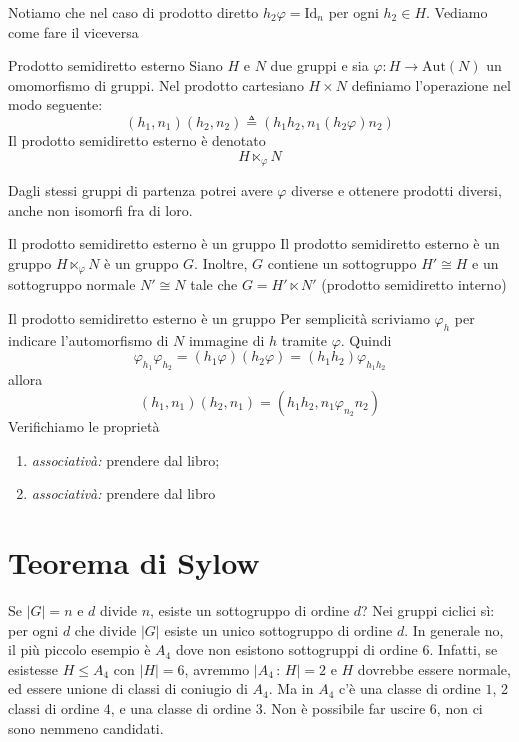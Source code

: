 \documentclass[a4paper]{article}
\begin{document}
Notiamo che nel caso di prodotto diretto
\(h_2 \varphi = \text{Id}_n\) per ogni \(h_2 \in H\).
Vediamo come fare il viceversa

\begin{snippetdefinition}{Prodotto semidiretto esterno}
    Siano \(H\) e \(N\) due gruppi e sia \(\varphi\colon H \to \text{Aut}(N)\)
    un omomorfismo di gruppi. Nel prodotto cartesiano
    \(H \times N\) definiamo l'operazione nel modo seguente:
    \[
        (h_1, n_1)(h_2, n_2) \triangleq (h_1h_2, n_1(h_2 \varphi) n_2)
    \]
    Il prodotto semidiretto esterno è denotato
    \[
        H \ltimes_\varphi N
    \]
\end{snippetdefinition}

Dagli stessi gruppi di partenza potrei avere \(\varphi\) diverse e ottenere
prodotti diversi, anche non isomorfi fra di loro.

\begin{snippettheorem}{Il prodotto semidiretto esterno è un gruppo}
    Il prodotto semidiretto esterno è un gruppo
    \(H \ltimes_\varphi N\) è un gruppo \(G\). Inoltre,
    \(G\) contiene un sottogruppo \(H' \cong H\) e
    un sottogruppo normale \(N' \cong N\)
    tale che \(G = H'\ltimes N'\) (prodotto semidiretto interno)
\end{snippettheorem}

\begin{snippetproof}{Il prodotto semidiretto esterno è un gruppo}
    Per semplicità scriviamo \(\varphi_h\) per indicare l'automorfismo
    di \(N\) immagine di \(h\) tramite \(\varphi\).
    Quindi \[
        \varphi_{h_1}\varphi_{h_2} =
        (h_1 \varphi)(h_2 \varphi) = (h_1h_2)\varphi_{h_1h_2}
    \]
    allora
    \[
        (h_1, n_1)(h_2, n_1) = (h_1h_2, n_1\varphi_{n_2} n_2)
    \]
    Verifichiamo le proprietà
    \begin{enumerate}
        \item \emph{associativà:} prendere dal libro;
        \item \emph{associativà:} prendere dal libro
    \end{enumerate}
\end{snippetproof}

\pagebreak

\section{Teorema di Sylow}

Se \(|G| = n\) e \(d\) divide \(n\), esiste un sottogruppo di ordine \(d\)?
Nei gruppi ciclici sì: per ogni \(d\) che divide \(|G|\) esiste un unico sottogruppo di ordine \(d\).
In generale no, il più piccolo esempio è \(A_4\)
dove non esistono sottogruppi di ordine \(6\).
Infatti, se esistesse \(H \leq A_4\)
con \(|H| = 6\), avremmo \(|A_4 \,:\, H| = 2\)
e \(H\) dovrebbe essere normale, ed essere unione di classi di coniugio di \(A_4\).
Ma in \(A_4\) c'è una classe di ordine \(1\), 2 classi di ordine \(4\),
e una classe di ordine \(3\). Non è possibile far uscire \(6\), non ci sono nemmeno candidati.
\end{document}
